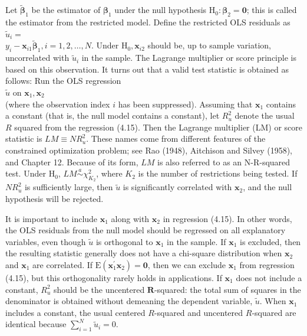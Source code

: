 \documentclass[10pt]{article}
\begin{document}
Let $\tilde{\boldsymbol{\beta}}_{1}$ be the estimator of $\boldsymbol{\beta}_{1}$ under the null hypothesis $\mathrm{H}_{0}: \boldsymbol{\beta}_{2}=\mathbf{0}$; this is called the estimator from the restricted model. Define the restricted OLS residuals as $\tilde{u}_{i}=$\\
$y_{i}-\mathbf{x}_{i 1} \tilde{\boldsymbol{\beta}}_{1}, i=1,2, \ldots, N$. Under $\mathrm{H}_{0}, \mathbf{x}_{i 2}$ should be, up to sample variation, uncorrelated with $\tilde{u}_{i}$ in the sample. The Lagrange multiplier or score principle is based on this observation. It turns out that a valid test statistic is obtained as follows: Run the OLS regression\\
$\tilde{u}$ on $\mathbf{x}_{1}, \mathbf{x}_{2}$\\
(where the observation index $i$ has been suppressed). Assuming that $\mathbf{x}_{1}$ contains a constant (that is, the null model contains a constant), let $R_{u}^{2}$ denote the usual $R$ squared from the regression (4.15). Then the Lagrange multiplier (LM) or score statistic is $L M \equiv N R_{u}^{2}$. These names come from different features of the constrained optimization problem; see Rao (1948), Aitchison and Silvey (1958), and Chapter 12. Because of its form, $L M$ is also referred to as an N-R-squared test. Under $\mathrm{H}_{0}$, $L M \stackrel{a}{\sim} \chi_{K_{2}}^{2}$, where $K_{2}$ is the number of restrictions being tested. If $N R_{u}^{2}$ is sufficiently large, then $\tilde{u}$ is significantly correlated with $\mathbf{x}_{2}$, and the null hypothesis will be rejected.

It is important to include $\mathbf{x}_{1}$ along with $\mathbf{x}_{2}$ in regression (4.15). In other words, the OLS residuals from the null model should be regressed on all explanatory variables, even though $\tilde{u}$ is orthogonal to $\mathbf{x}_{1}$ in the sample. If $\mathbf{x}_{1}$ is excluded, then the resulting statistic generally does not have a chi-square distribution when $\mathbf{x}_{2}$ and $\mathbf{x}_{1}$ are correlated. If $\mathrm{E}\left(\mathbf{x}_{1}^{\prime} \mathbf{x}_{2}\right)=\mathbf{0}$, then we can exclude $\mathbf{x}_{1}$ from regression (4.15), but this orthogonality rarely holds in applications. If $\mathbf{x}_{1}$ does not include a constant, $R_{u}^{2}$ should be the uncentered $\mathbf{R}$-squared: the total sum of squares in the denominator is obtained without demeaning the dependent variable, $\tilde{u}$. When $\mathbf{x}_{1}$ includes a constant, the usual centered $R$-squared and uncentered $R$-squared are identical because $\sum_{i=1}^{N} \tilde{u}_{i}=0$.
\end{document}
